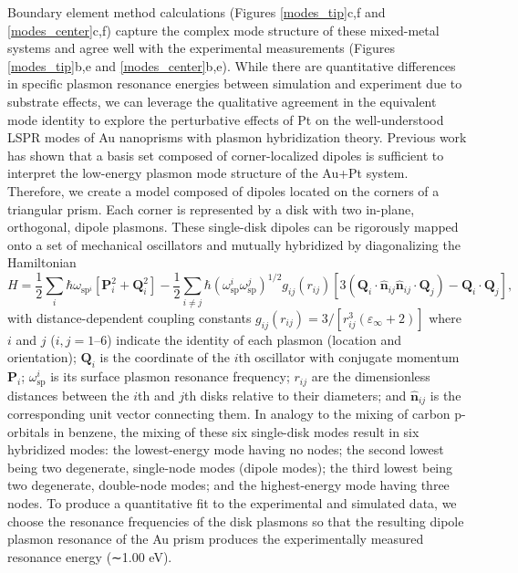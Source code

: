 \documentclass [11pt, proquest] {uwthesis}[2016/11/22]
\begin{document}
Boundary element method calculations\cite{Hohenester2012,Hohenester2014} (Figures \ref{modes_tip}c,f and \ref{modes_center}c,f) capture the complex mode structure of these mixed-metal systems and agree well with the experimental measurements (Figures \ref{modes_tip}b,e and \ref{modes_center}b,e). While there are quantitative differences in specific plasmon resonance energies between simulation and experiment due to substrate effects, we can leverage the qualitative agreement in the equivalent mode identity to explore the perturbative effects of Pt on the well-understood LSPR modes\cite{HohenesterDisk} of Au nanoprisms with plasmon hybridization theory. Previous work\cite{Nanodecahedra,Decahedra} has shown that a basis set composed of corner-localized dipoles is sufficient to interpret the low-energy plasmon mode structure of the Au+Pt system. Therefore, we create a model composed of dipoles located on the corners of a triangular prism\cite{Quillin,Zohar}. Each corner is represented by a disk with two in-plane, orthogonal, dipole plasmons. These single-disk dipoles can be rigorously mapped onto a set of mechanical oscillators and mutually hybridized by diagonalizing the Hamiltonian\cite{Cherqui2014}
\begin{equation}
H = \frac{1}{2}\sum_{i}\hbar\omega_{\textrm{sp}^i}[\textbf{P}_i^2 + \textbf{Q}_i^2] - \frac{1}{2}\sum_{i \neq j}\hbar(\omega_{\textrm{sp}}^i\omega_{\textrm{sp}}^j)^{1/2}g_{ij}(r_{ij})[3(\textbf{Q}_i\cdot\hat{\textbf{n}}_{ij}\hat{\textbf{n}}_{ij}\cdot\textbf{Q}_j)-\textbf{Q}_i\cdot\textbf{Q}_j],
\label{prism_hammy}
\end{equation}
with distance-dependent coupling constants $g_{ij}(r_{ij}) = 3/[r_{ij}^3(\varepsilon_{\infty} + 2)]$ where $i$ and $j$ ($i, j = 1–6$) indicate the identity of each plasmon (location and orientation); $\textbf{Q}_i$ is the coordinate of the $i$th oscillator with conjugate momentum $\textbf{P}_i$; $\omega_{\textrm{sp}}^i$ is its surface plasmon resonance frequency; $r_{ij}$ are the dimensionless distances between the $i$th and $j$th disks relative to their diameters; and $\hat{\textbf{n}}_{ij}$ is the corresponding unit vector connecting them.
In analogy to the mixing of carbon p-orbitals in benzene, the mixing of these six single-disk modes result in six hybridized modes: the lowest-energy mode having no nodes; the second lowest being two degenerate, single-node modes (dipole modes); the third lowest being two degenerate, double-node modes; and the highest-energy mode having three nodes. To produce a quantitative fit to the experimental and simulated data, we choose the resonance frequencies of the disk plasmons so that the resulting dipole plasmon resonance of the Au prism produces the experimentally measured resonance energy (∼1.00 eV).
\end{document}
